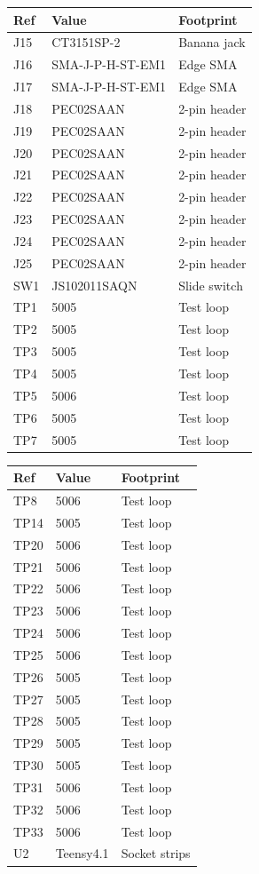 \documentclass[10pt,letterpaper]{article}
\begin{document}
\begin{tabular}[t]{@{}lll@{}}\toprule Ref & Value & Footprint\\\midrule
J15 & CT3151SP-2 & Banana jack\\
J16 & SMA-J-P-H-ST-EM1 & Edge SMA\\
J17 & SMA-J-P-H-ST-EM1 & Edge SMA\\
J18 & PEC02SAAN & 2-pin header\\
J19 & PEC02SAAN & 2-pin header\\
J20 & PEC02SAAN & 2-pin header\\
J21 & PEC02SAAN & 2-pin header\\
J22 & PEC02SAAN & 2-pin header\\
J23 & PEC02SAAN & 2-pin header\\
J24 & PEC02SAAN & 2-pin header\\
J25 & PEC02SAAN & 2-pin header\\
SW1 & JS102011SAQN & Slide switch\\
TP1 & 5005 & Test loop\\
TP2 & 5005 & Test loop\\
TP3 & 5005 & Test loop\\
TP4 & 5005 & Test loop\\
TP5 & 5006 & Test loop\\
TP6 & 5005 & Test loop\\
TP7 & 5005 & Test loop\\
\bottomrule\end{tabular}\hfill
\begin{tabular}[t]{@{}lll@{}}\toprule Ref & Value & Footprint\\\midrule
TP8 & 5006 & Test loop\\
TP14 & 5005 & Test loop\\
TP20 & 5006 & Test loop\\
TP21 & 5006 & Test loop\\
TP22 & 5006 & Test loop\\
TP23 & 5006 & Test loop\\
TP24 & 5006 & Test loop\\
TP25 & 5006 & Test loop\\
TP26 & 5005 & Test loop\\
TP27 & 5005 & Test loop\\
TP28 & 5005 & Test loop\\
TP29 & 5005 & Test loop\\
TP30 & 5005 & Test loop\\
TP31 & 5006 & Test loop\\
TP32 & 5006 & Test loop\\
TP33 & 5006 & Test loop\\
U2 & Teensy4.1 & Socket strips\\
\bottomrule\end{tabular}
\end{document}
